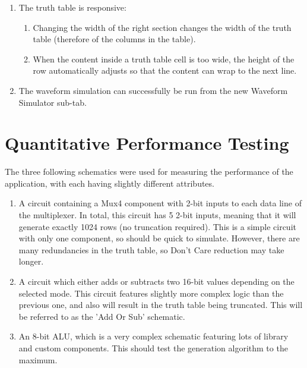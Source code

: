 \begin{enumerate}
    \item The truth table is responsive:
    \begin{enumerate}
        \item Changing the width of the right section changes the width of the truth table (therefore of the columns in the table).
        \item When the content inside a truth table cell is too wide, the height of the row automatically adjusts so that the content can wrap to the next line.
    \end{enumerate}
    \item The waveform simulation can successfully be run from the new Waveform Simulator sub-tab.
\end{enumerate}

\section{Quantitative Performance Testing}
The three following schematics were used for measuring the performance of the application, with each having slightly different attributes.
\begin{enumerate}
    \item A circuit containing a Mux4 component with 2-bit inputs to each data line of the multiplexer. In total, this circuit has 5 2-bit inputs, meaning that it will generate exactly 1024 rows (no truncation required). This is a simple circuit with only one component, so should be quick to simulate. However, there are many redundancies in the truth table, so Don't Care reduction may take longer.
    \item A circuit which either adds or subtracts two 16-bit values depending on the selected mode. This circuit features slightly more complex logic than the previous one, and also will result in the truth table being truncated. This will be referred to as the 'Add Or Sub' schematic.
    \item An 8-bit ALU, which is a very complex schematic featuring lots of library and custom components. This should test the generation algorithm to the maximum.
\end{enumerate}

